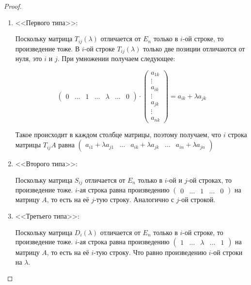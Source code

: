 \begin{proof}

    \begin{enumerate}
        \item <<Первого типа>>:
        
        Поскольку матрица $T_{ij}(\lambda)$ отличается от $E_n$ только в $i$-ой строке, то произведение тоже. В $i$-ой строке $T_{ij}(\lambda)$ только две позиции отличаются от нуля, это $i$ и $j$. При умножении получаем следующее:

        \[ \begin{pmatrix}
            0 & \ldots & 1 & \ldots & \lambda & \ldots & 0
        \end{pmatrix} \cdot \begin{pmatrix}
            a_{1k} \\
            \vdots \\
            a_{ik} \\
            \vdots \\
            a_{jk} \\
            \vdots \\
            a_{nk}
        \end{pmatrix} = a_{ik} + \lambda a_{jk} \]

        Такое происходит в каждом столбце матрицы, поэтому получаем, что $i$ строка матрицы $T_{ij} A$ равна $\begin{pmatrix}
            a_{i1} + \lambda a_{j1} & \ldots & a_{ik} + \lambda a_{jk} & \ldots & a_{in} + \lambda a_{jn}
        \end{pmatrix}$
        
        \item <<Второго типа>>:
        
        Поскольку матрица $S_{ij}$ отличается от $E_n$ только в $i$-ой и $j$-ой строках, то произведение тоже. $i$-ая строка равна произведению $\begin{pmatrix}
            0 & \ldots & 1 & \ldots & 0
        \end{pmatrix}$ на матрицу $A$, то есть на её $j$-тую строку. Аналогично с $j$-ой строкой. 

        \item <<Третьего типа>>:
        
        Поскольку матрица $D_i(\lambda)$ отличается от $E_n$ только в $i$-ой строке, то произведение тоже. $i$-ая строка равна произведению $\begin{pmatrix}
            1 & \ldots & \lambda & \ldots & 1
        \end{pmatrix}$ на матрицу $A$, то есть на её $i$-тую строку. Что равно произведению $i$-ой строки на $\lambda$.
    \end{enumerate} 
\end{proof}

